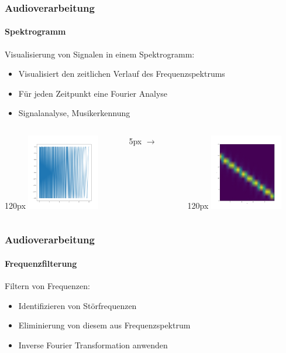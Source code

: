 \begin{frame}
    \frametitle{Audioverarbeitung}
    \framesubtitle{Spektrogramm}
    Visualisierung von Signalen in einem Spektrogramm:
    \begin{itemize}
        \item Visualisiert den zeitlichen Verlauf des Frequenzspektrums
        \item Für jeden Zeitpunkt eine Fourier Analyse
        \item Signalanalyse, Musikerkennung
    \end{itemize} 
    \begin{columns}
        \begin{column}{120px}
            \includegraphics[width=120px]{images/04-applications-audio-chirp.png}
        \end{column}
        \hspace*{-25px}
        \begin{column}{5px}
            $\rightarrow$
        \end{column}
        \hspace*{-25px}
        \begin{column}{120px}
            \includegraphics[width=120px]{images/04-applications-audio-chirp-spectrogram.png} 
        \end{column}
    \end{columns}
\end{frame}

\begin{frame}
    \frametitle{Audioverarbeitung}
    \framesubtitle{Frequenzfilterung}
    Filtern von Frequenzen:
    \begin{itemize}
        \item Identifizieren von Störfrequenzen
        \item Eliminierung von diesem aus Frequenzspektrum
        \item Inverse Fourier Transformation anwenden
    \end{itemize}
\end{frame}

